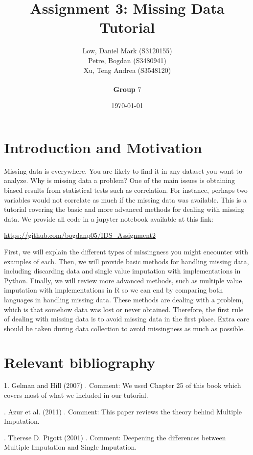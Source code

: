 \documentclass[a4paper]{article}
\title{Assignment 3: Missing Data Tutorial}
\author{
Low, Daniel Mark (S3120155) \\
Petre, Bogdan (S3480941) \\
Xu, Teng Andrea (S3548120) \\ 
 \\ \textbf{Group} 7}
\date{\today}
\begin{document}
\maketitle


\section*{Introduction and Motivation}
Missing data is everywhere. You are likely to find it in any dataset you want to analyze. Why is missing data a problem? One of the main issues is obtaining biased results from statistical tests such as correlation. For instance, perhaps two variables would not correlate as much if the missing data was available. 
This is a tutorial covering the basic and more advanced methods for dealing with missing data. We provide all code in a jupyter notebook available at this link: 

\url{https://github.com/bogdanp05/IDS_Assignment2}

\par\noindent First, we will explain the different types of missingness you might encounter with examples of each. Then, we will provide basic methods for handling missing data, including discarding data and single value imputation with implementations in Python. Finally, we will review more advanced methods, such as multiple value imputation with implementations in R so we can end by comparing both languages in handling missing data.
These methods are dealing with a problem, which is that somehow data was lost or never obtained. Therefore, the first rule of dealing with missing data is to avoid missing data in the first place. Extra care should be taken during data collection to avoid missingness as much as possible.

\section{Relevant bibliography}
1. Gelman and Hill (2007) \cite{Gelmann}.
Comment: We used Chapter 25 of this book which covers most of what we included in our tutorial.

\par{}. Azur et al. (2011) \cite{MICE}. 
Comment: This paper reviews the theory behind Multiple Imputation.

\par{}. Therese D. Pigott (2001) \cite{AReviewofMethods}.
Comment: Deepening the differences between Multiple Imputation and Single Imputation.
\end{document}
